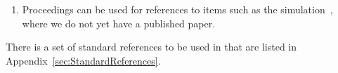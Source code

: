 \begin{enumerate}
\item Proceedings can be used for references to items such as the
  \lhcb simulation~\cite{LHCb-PROC-2011-006}, where we do not yet have
  a published paper.

\end{enumerate}

There is a set of standard references to be used in \lhcb that are
listed in Appendix~\ref{sec:StandardReferences}.
